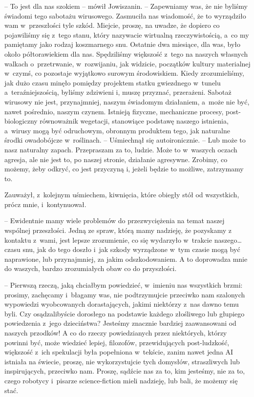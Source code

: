 \documentclass[oneside,polish,11pt,sfheadings]{mwbk}
\begin{document}
-- To jest dla nas szokiem -- mówił Jowiszanin. -- Zapewniamy was,
że nie byliśmy świadomi tego sabotażu wirusowego. Zasmuciła nas
wiadomość, że to wyrządziło wam w~przeszłości tyle szkód. Miejcie,
proszę, na uwadze, że dopiero co pojawiliśmy się z~tego stanu, który
nazywacie wirtualną rzeczywistością, a~co my pamiętamy jako rodzaj
koszmarnego snu. Ostatnie dwa miesiące, dla was, było około
półtorawiekiem dla nas. Spędziliśmy większość z~tego na naszych własnych
walkach o~przetrwanie, w~rozwijaniu, jak widzicie, początków kultury
materialnej w~czymś, co pozostaje wyjątkowo surowym środowiskiem. Kiedy
zrozumieliśmy, jak dużo czasu minęło pomiędzy projektem statku
gwiezdnego w~tunelu a~teraźniejszością, byliśmy zdziwieni i, muszę
przyznać, przerażeni. Sabotaż wirusowy nie jest, przynajmniej, naszym
świadomym działaniem, a~może nie być, nawet pośrednio, naszym czynem.
Istnieją fizyczne, mechaniczne procesy, post-biologiczny równoważnik
wegetacji, stanowiące podstawę naszego istnienia, a~wirusy mogą być
odruchowym, obronnym produktem tego, jak naturalne środki owadobójcze w~roślinach. -- Uśmiechnął się autoironicznie. -- Lub może to nasz naturalny
zapach. Przepraszam za to, ludzie. Może to w~waszych oczach agresja, ale
nie jest to, po naszej stronie, działanie agresywne. Zrobimy, co możemy,
żeby odkryć, co jest przyczyną i, jeżeli będzie to możliwe, zatrzymamy
to.

Zauważył, z~kolejnym uśmiechem, kiwnięcia, które obiegły stół od
wszystkich, prócz mnie, i~kontynuował.

-- Ewidentnie mamy wiele problemów do przezwyciężenia na temat naszej
wspólnej przeszłości. Jedną ze spraw, którą mamy nadzieję, że pozyskamy
z kontaktu z~wami, jest lepsze zrozumienie, co się wydarzyło w~trakcie
naszego\ldots  czasu snu, jak do tego doszło i~jak szkody wyrządzone w~tym
czasie mogą być naprawione, lub przynajmniej, za jakim odszkodowaniem. A
to doprowadza mnie do waszych, bardzo zrozumiałych obaw co do
przyszłości.

-- Pierwszą rzeczą, jaką chciałbym powiedzieć, w~imieniu nas wszystkich
brzmi: prosimy, zachęcamy i~błagamy was, nie podtrzymujcie przeciwko nam
szalonych wypowiedzi wyobcowanych dorastających, jakimi niektórzy z~nas
dawno temu byli. Czy osądzalibyście dorosłego na podstawie każdego
złośliwego lub głupiego powiedzenia z~jego dzieciństwa? Jesteśmy
znacznie bardziej zaawansowani od naszych przodków! A co do rzeczy
powiedzianych przez niektórych, którzy powinni być, może wiedzieć
lepiej, filozofów, przewidujących post-ludzkość, większość z~ich
spekulacji była popełniona w~tekście, zanim nawet jedna AI istniała na
świecie, proszę, nie wykorzystujcie tych domysłów, straszliwych lub
inspirujących, przeciwko nam. Proszę, sądźcie nas za to, kim jesteśmy,
nie za to, czego robotycy i~pisarze science-fiction mieli nadzieję, lub
bali, że możemy się stać.
\end{document}
